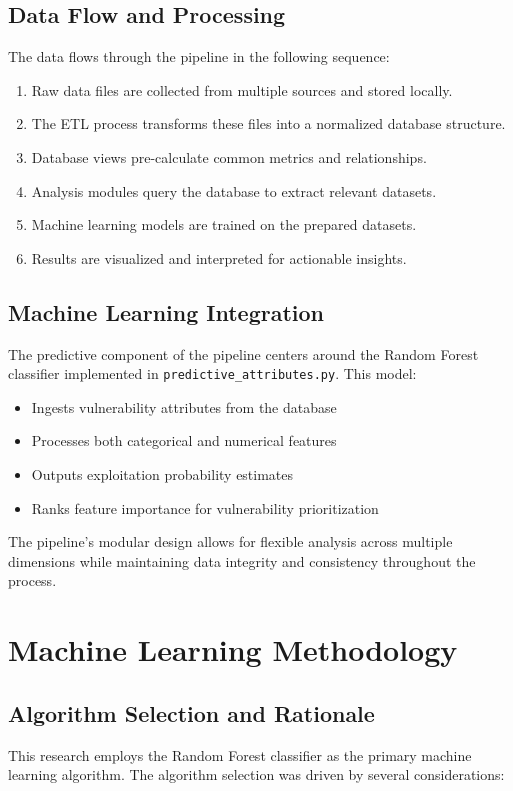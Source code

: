 \documentclass[runningheads]{llncs}
\begin{document}
\subsection{Data Flow and Processing}
The data flows through the pipeline in the following sequence:

\begin{enumerate}
    \item Raw data files are collected from multiple sources and stored locally.
    \item The ETL process transforms these files into a normalized database structure.
    \item Database views pre-calculate common metrics and relationships.
    \item Analysis modules query the database to extract relevant datasets.
    \item Machine learning models are trained on the prepared datasets.
    \item Results are visualized and interpreted for actionable insights.
\end{enumerate}

\subsection{Machine Learning Integration}
The predictive component of the pipeline centers around the Random Forest classifier implemented in \texttt{predictive\_attributes.py}. This model:

\begin{itemize}
    \item Ingests vulnerability attributes from the database
    \item Processes both categorical and numerical features
    \item Outputs exploitation probability estimates
    \item Ranks feature importance for vulnerability prioritization
\end{itemize}

The pipeline's modular design allows for flexible analysis across multiple dimensions while maintaining data integrity and consistency throughout the process.

\section{Machine Learning Methodology}
\label{sec:ml_methodology}

\subsection{Algorithm Selection and Rationale}
This research employs the Random Forest classifier as the primary machine learning algorithm. The algorithm selection was driven by several considerations:
\end{document}
